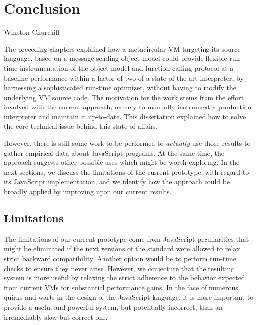 \chapter{Conclusion}
\label{chap:Conclusion}


{Winston Churchill}


The preceding chapters explained how a metacircular VM targeting its source
language, based on a message-sending object model could provide flexible
run-time instrumentation of the object model and function-calling protocol at a
baseline performance within a factor of two of a state-of-the-art interpreter,
by harnessing a sophisticated run-time optimizer, without having to modify the
underlying VM source code. The motivation for the work stems from the effort
involved with the current approach, namely to manually instrument a production
interpreter and maintain it up-to-date. This dissertation explained how to
solve the core technical issue behind this state of affairs. 

However, there is still some work to be performed to \textit{actually} use
those results to gather empirical data about JavaScript programs. At the same
time, the approach suggests other possible uses which might be worth exploring.
In the next sections, we discuss the limitations of the current prototype, with
regard to its JavaScript implementation, and we identify how the approach could
be broadly applied by improving upon our current results.

\section{Limitations}

The limitations of our current prototype come from JavaScript peculiarities
that might be eliminated if the next versions of the standard were
allowed to relax strict backward compatibility. Another option would be
to perform run-time checks to ensure they never arise.  However, we conjecture
that the resulting system is more useful by relaxing the strict adherence to
the behavior expected from current VMs for substantial performance gains.  In
the face of numerous quirks and warts in the design of the JavaScript language,
it is more important to provide a useful and powerful system, but potentially
incorrect, than an irremediably slow but correct one.

